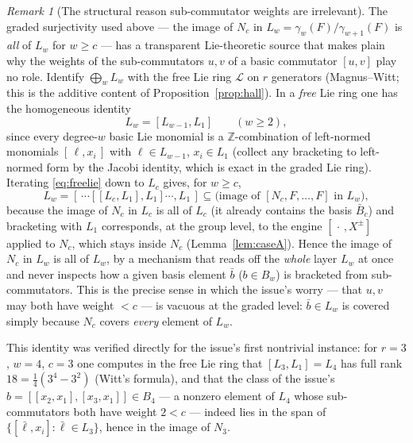 \documentclass{amsart}
\theoremstyle{definition}
\theoremstyle{remark}
\newtheorem{remark}{Remark}
\begin{document}
\begin{remark}[The structural reason sub-commutator weights are irrelevant]
\label{rem:freelie}
The graded surjectivity used above --- the image of $N_c$ in
$L_w=\gamma_w(F)/\gamma_{w+1}(F)$ is \emph{all} of $L_w$ for $w\ge c$ --- has a
transparent Lie-theoretic source that makes plain why the weights of the
sub-commutators $u,v$ of a basic commutator $[u,v]$ play no role. Identify
$\bigoplus_w L_w$ with the free Lie ring $\mathcal L$ on $r$ generators
(Magnus--Witt; this is the additive content of Proposition~\ref{prop:hall}). In a
\emph{free} Lie ring one has the homogeneous identity
\begin{equation}\label{eq:freelie}
L_w=[L_{w-1},L_1]\qquad(w\ge2),
\end{equation}
since every degree-$w$ basic Lie monomial is a $\mathbb Z$-combination of left-normed
monomials $[\,\ell,x_i\,]$ with $\ell\in L_{w-1}$, $x_i\in L_1$ (collect any bracketing
to left-normed form by the Jacobi identity, which is exact in the graded Lie ring).
Iterating \eqref{eq:freelie} down to $L_c$ gives, for $w\ge c$,
\[
L_w=[\,\cdots[[L_c,L_1],L_1]\cdots,L_1\,]\subseteq \text{(image of $[N_c,F,\dots,F]$ in $L_w$)} ,
\]
because the image of $N_c$ in $L_c$ is all of $L_c$ (it already contains the basis
$\bar B_c$) and bracketing with $L_1$ corresponds, at the group level, to the engine
$[\,\cdot\,,X^{\pm}]$ applied to $N_c$, which stays inside $N_c$
(Lemma~\ref{lem:caseA}). Hence the image of $N_c$ in $L_w$ is all of $L_w$, by a
mechanism that reads off the \emph{whole} layer $L_w$ at once and never inspects how a
given basis element $\bar b$ ($b\in B_w$) is bracketed from sub-commutators. This is the
precise sense in which the issue's worry --- that $u,v$ may both have weight $<c$ --- is
vacuous at the graded level: $\bar b\in L_w$ is covered simply because $N_c$ covers
\emph{every} element of $L_w$.

This identity was verified directly for the issue's first nontrivial instance: for
$r=3$, $w=4$, $c=3$ one computes in the free Lie ring that
$[L_3,L_1]=L_4$ has full rank $18=\tfrac14(3^4-3^2)$ (Witt's formula), and that the
class of the issue's $b=[[x_2,x_1],[x_3,x_1]]\in B_4$ --- a nonzero element of $L_4$
whose sub-commutators both have weight $2<c$ --- indeed lies in the span of
$\{[\bar\ell,x_i]:\bar\ell\in L_3\}$, hence in the image of $N_3$.
\end{remark}
\end{document}

